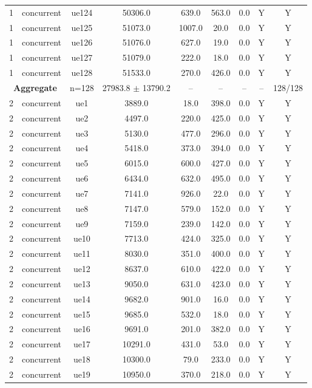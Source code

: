 \begin{table}[ht]
\begin{tabular}{|c|c|c|c|c|c|c|c|c|}
1 & concurrent & ue124 & 50306.0 & 639.0 & 563.0 & 0.0 & Y & Y \\
1 & concurrent & ue125 & 51073.0 & 1007.0 & 20.0 & 0.0 & Y & Y \\
1 & concurrent & ue126 & 51076.0 & 627.0 & 19.0 & 0.0 & Y & Y \\
1 & concurrent & ue127 & 51079.0 & 222.0 & 18.0 & 0.0 & Y & Y \\
1 & concurrent & ue128 & 51533.0 & 270.0 & 426.0 & 0.0 & Y & Y \\
\multicolumn{2}{|c|}{\textbf{Aggregate}} & n=128 & 27983.8 $\pm$ 13790.2 & -- & -- & -- & -- & 128/128 \\
\hline
2 & concurrent & ue1 & 3889.0 & 18.0 & 398.0 & 0.0 & Y & Y \\
2 & concurrent & ue2 & 4497.0 & 220.0 & 425.0 & 0.0 & Y & Y \\
2 & concurrent & ue3 & 5130.0 & 477.0 & 296.0 & 0.0 & Y & Y \\
2 & concurrent & ue4 & 5418.0 & 373.0 & 394.0 & 0.0 & Y & Y \\
2 & concurrent & ue5 & 6015.0 & 600.0 & 427.0 & 0.0 & Y & Y \\
2 & concurrent & ue6 & 6434.0 & 632.0 & 495.0 & 0.0 & Y & Y \\
2 & concurrent & ue7 & 7141.0 & 926.0 & 22.0 & 0.0 & Y & Y \\
2 & concurrent & ue8 & 7147.0 & 579.0 & 152.0 & 0.0 & Y & Y \\
2 & concurrent & ue9 & 7159.0 & 239.0 & 142.0 & 0.0 & Y & Y \\
2 & concurrent & ue10 & 7713.0 & 424.0 & 325.0 & 0.0 & Y & Y \\
2 & concurrent & ue11 & 8030.0 & 351.0 & 400.0 & 0.0 & Y & Y \\
2 & concurrent & ue12 & 8637.0 & 610.0 & 422.0 & 0.0 & Y & Y \\
2 & concurrent & ue13 & 9050.0 & 631.0 & 423.0 & 0.0 & Y & Y \\
2 & concurrent & ue14 & 9682.0 & 901.0 & 16.0 & 0.0 & Y & Y \\
2 & concurrent & ue15 & 9685.0 & 532.0 & 18.0 & 0.0 & Y & Y \\
2 & concurrent & ue16 & 9691.0 & 201.0 & 382.0 & 0.0 & Y & Y \\
2 & concurrent & ue17 & 10291.0 & 431.0 & 53.0 & 0.0 & Y & Y \\
2 & concurrent & ue18 & 10300.0 & 79.0 & 233.0 & 0.0 & Y & Y \\
2 & concurrent & ue19 & 10950.0 & 370.0 & 218.0 & 0.0 & Y & Y \\

\end{tabular}
\end{table}
